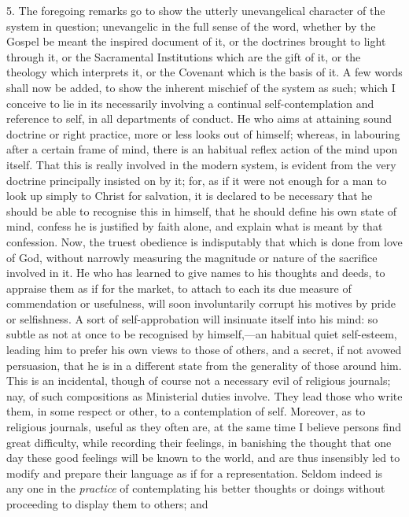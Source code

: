 5. The foregoing remarks go to show the utterly unevangelical
character of the system in question; unevangelic in the full sense of
the word, whether by the Gospel be meant the inspired document of it, or
the doctrines brought to light through it, or the Sacramental
Institutions which are the gift of it, or the theology which interprets
it, or the Covenant which is the basis of it. A few words shall now be
added, to show the inherent mischief of the system as such; which I
conceive to lie in its necessarily involving a continual
self-contemplation and reference to self, in all departments of conduct.
He who aims at attaining sound doctrine or right practice, more or less
looks out of himself; whereas, in labouring after a certain frame of
mind, there is an habitual reflex action of the mind upon itself. That
this is really involved in the modern system, is evident from the very
doctrine principally insisted on by it; for, as if it were not enough
for a man to look up simply to Christ for salvation, it is declared to
be necessary that he should be able to recognise this in himself, that
he should define his own state of mind, confess he is justified by faith
alone, and explain what is meant by that confession. Now, the truest
obedience is indisputably that which is done from love of God, without
narrowly measuring the magnitude or nature of the sacrifice involved in
it. He who has learned to give names to his thoughts and deeds, to
appraise them as if for the market, to attach to each its due measure of
commendation or usefulness, will soon involuntarily corrupt his motives
by pride or selfishness. A sort of self-approbation will insinuate
itself into his mind: so subtle as not at once to be recognised by
himself,—an habitual quiet self-esteem, leading him to prefer his own
views to those of others, and a secret, if not avowed persuasion, that
he is in a different state from the generality of those around him. This
is an incidental, though of course not a necessary evil of religious
journals; nay, of such compositions as Ministerial duties involve. They
lead those who write them, in some respect or other, to a contemplation
of self. Moreover, as to religious journals, useful as they often are,
at the same time I believe persons find great difficulty, while
recording their feelings, in banishing the thought that one day these
good feelings will be known to the world, and are thus insensibly led to
modify and prepare their language as if for a representation. Seldom
indeed is any one in the \emph{practice} of contemplating his better
thoughts or doings without proceeding to display them to others; and
